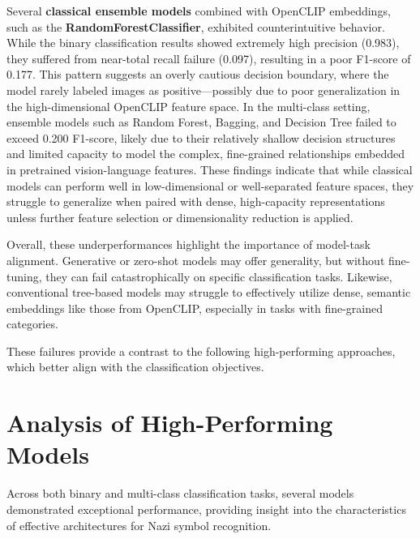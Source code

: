 Several \textbf{classical ensemble models} combined with OpenCLIP embeddings, such as the
\textbf{RandomForestClassifier}, exhibited counterintuitive behavior. While the binary classification results showed
extremely high precision (0.983), they suffered from near-total recall failure (0.097), resulting in a poor F1-score
of 0.177. This pattern suggests an overly cautious decision boundary, where the model rarely labeled images as
positive—possibly due to poor generalization in the high-dimensional OpenCLIP feature space. In the multi-class
setting, ensemble models such as Random Forest, Bagging, and Decision Tree failed to exceed 0.200 F1-score, likely
due to their relatively shallow decision structures and limited capacity to model the complex, fine-grained
relationships embedded in pretrained vision-language features. These findings indicate that while classical models
can perform well in low-dimensional or well-separated feature spaces, they struggle to generalize when paired with
dense, high-capacity representations unless further feature selection or dimensionality reduction is applied.

Overall, these underperformances highlight the importance of model-task alignment. Generative or zero-shot models
may offer generality, but without fine-tuning, they can fail catastrophically on specific classification tasks.
Likewise, conventional tree-based models may struggle to effectively utilize dense, semantic embeddings like those
from OpenCLIP, especially in tasks with fine-grained categories.

These failures provide a contrast to the following high-performing approaches, which better align with the
classification objectives.

\section{Analysis of High-Performing Models}

Across both binary and multi-class classification tasks, several models demonstrated exceptional performance,
providing insight into the characteristics of effective architectures for Nazi symbol recognition.

